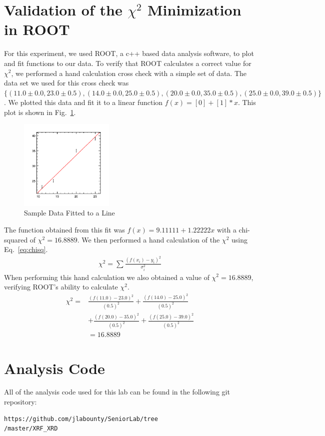 \documentclass[%
 reprint,
 amsmath,amssymb,
 aps,
 pra,
]{revtex4-1}
\begin{document}
\begin{appendix}
\section{Validation of the $\chi^2$ Minimization in ROOT} \label{section:root}
For this experiment, we used ROOT, a c++ based data analysis software, to plot and fit functions to our data. To verify that ROOT calculates a correct value for $\chi^{2}$, we performed a hand calculation cross check with a simple set of data. The data set we used for this cross check was $\{ (11.0 \pm 0.0, 23.0 \pm 0.5), (14.0 \pm 0.0, 25.0 \pm 0.5), (20.0 \pm 0.0, 35.0 \pm 0.5), (25.0 \pm 0.0, 39.0 \pm 0.5) \}$. We plotted this data and fit it to a linear function $f(x) = [0] + [1]*x$. This plot is shown in Fig.~\ref{Fig:rootproof}.
\begin{figure}[H]
	\centering
	\includegraphics[width=0.4\textwidth]{rootproof.png}
	\caption{Sample Data Fitted to a Line}
	\label{Fig:rootproof}
\end{figure}
The function obtained from this fit was $f(x) = 9.11111 + 1.22222x$ with a chi-squared of $\chi ^{2} = 16.8889$. We then performed a hand calculation of the $\chi ^{2}$ using Eq.~\ref{eq:chisq}.
\begin{gather}\label{eq:chisq}
\chi ^{2} = \sum \frac{(f(x_i) - y_i)^{2}}{\sigma_i^2}
\end{gather}
When performing this hand calculation we also obtained a value of $\chi ^{2} = 16.8889$, verifying ROOT's ability to calculate $\chi ^{2}$.
\begin{align*}
\chi ^{2} =& \frac{(f(11.0) - 23.0)^{2}}{(0.5)^2} + \frac{(f(14.0) - 25.0)^{2}}{(0.5)^2} \\
&+ \frac{(f(20.0) - 35.0)^2}{(0.5)^2} + \frac{(f(25.0) - 39.0)^{2}}{(0.5)^2} \\
&= 16.8889
\end{align*}

\section{Analysis Code} \label{section:analysis_code}
All of the analysis code used for this lab can be found in the following git repository: 
\begin{verbatim}
https://github.com/jlabounty/SeniorLab/tree
/master/XRF_XRD
\end{verbatim}

\end{appendix}
\end{document}
